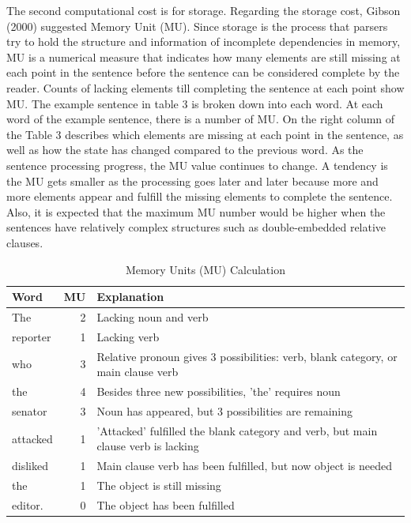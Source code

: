 \documentclass[
]{article}
\begin{document}
\vspace{1em}

\clearpage

\setlength{\parindent}{1.27cm}

The second computational cost is for storage. Regarding the storage
cost, Gibson (2000) suggested Memory Unit (MU). Since storage is the
process that parsers try to hold the structure and information of
incomplete dependencies in memory, MU is a numerical measure that
indicates how many elements are still missing at each point in the
sentence before the sentence can be considered complete by the reader.
Counts of lacking elements till completing the sentence at each point
show MU. The example sentence in table 3 is broken down into each word.
At each word of the example sentence, there is a number of MU. On the
right column of the Table 3 describes which elements are missing at each
point in the sentence, as well as how the state has changed compared to
the previous word. As the sentence processing progress, the MU value
continues to change. A tendency is the MU gets smaller as the processing
goes later and later because more and more elements appear and fulfill
the missing elements to complete the sentence. Also, it is expected that
the maximum MU number would be higher when the sentences have relatively
complex structures such as double-embedded relative clauses.

\vspace{1em}

\begingroup\fontsize{11}{13}\selectfont

\begin{longtable}[t]{lr>{\raggedright\arraybackslash}p{10cm}}
\caption{\label{tab:Table3_memory_unit}Memory Units (MU) Calculation}\\
\toprule
Word & MU & Explanation\\
\midrule
The & 2 & Lacking noun and verb\\
reporter & 1 & Lacking verb\\
who & 3 & Relative pronoun gives 3 possibilities: verb, blank category, or main clause verb\\
the & 4 & Besides three new possibilities, 'the' requires noun\\
senator & 3 & Noun has appeared, but 3 possibilities are remaining\\
\addlinespace
attacked & 1 & 'Attacked' fulfilled the blank category and verb, but main clause verb is lacking\\
disliked & 1 & Main clause verb has been fulfilled, but now object is needed\\
the & 1 & The object is still missing\\
editor. & 0 & The object has been fulfilled\\
\bottomrule
\end{longtable}
\endgroup{}
\end{document}
